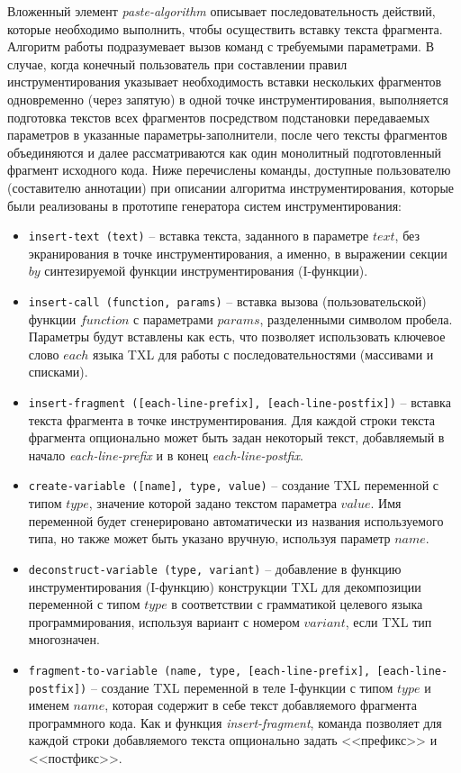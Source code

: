 Вложенный элемент \textit{paste-algorithm} описывает последовательность действий, которые необходимо выполнить, чтобы осуществить вставку текста фрагмента.
Алгоритм работы подразумевает вызов команд с требуемыми параметрами.
В случае, когда конечный пользователь при составлении правил инструментирования указывает необходимость вставки нескольких фрагментов одновременно (через запятую) в одной точке инструментирования, выполняется подготовка текстов всех фрагментов посредством подстановки передаваемых параметров в указанные параметры-заполнители, после чего тексты фрагментов объединяются и далее рассматриваются как один монолитный подготовленный фрагмент исходного кода.
Ниже перечислены команды, доступные пользователю (составителю аннотации) при описании алгоритма инструментирования, которые были реализованы в прототипе генератора систем инструментирования:

\begin{itemize}[noitemsep]
  \item \lstinline{insert-text (text)} --
  вставка текста, заданного в параметре $text$, без экранирования в точке инструментирования, а именно, в выражении секции $by$ синтезируемой функции инструментирования (I-функции).

  \item \lstinline{insert-call (function, params)} --
  вставка вызова (пользовательской) функции $function$ с параметрами $params$, разделенными символом пробела. Параметры будут вставлены как есть, что позволяет использовать ключевое слово $each$ языка TXL для работы с последовательностями (массивами и списками).

  \item \lstinline{insert-fragment ([each-line-prefix], [each-line-postfix])} --
  вставка текста фрагмента в точке инструментирования. Для каждой строки текста фрагмента опционально может быть задан некоторый текст, добавляемый в начало \textit{each-line-prefix} и в конец \textit{each-line-postfix}.

  \item \lstinline{create-variable ([name], type, value)} --
  создание TXL переменной с типом $type$, значение которой задано текстом параметра $value$. Имя переменной будет сгенерировано автоматически из названия используемого типа, но также может быть указано вручную, используя параметр $name$.

  \item \lstinline{deconstruct-variable (type, variant)} --
  добавление в функцию инструментирования (I-функцию) конструкции TXL для декомпозиции переменной с типом $type$ в соответствии с грамматикой целевого языка программирования, используя вариант с номером $variant$, если TXL тип многозначен.

  \item \lstinline{fragment-to-variable (name, type, [each-line-prefix], [each-line-postfix])} --
  создание TXL переменной в теле I-функции с типом $type$ и именем $name$, которая содержит в себе текст добавляемого фрагмента программного кода. Как и функция \textit{insert-fragment}, команда позволяет для каждой строки добавляемого текста опционально задать <<префикс>> и <<постфикс>>.
\end{itemize}

